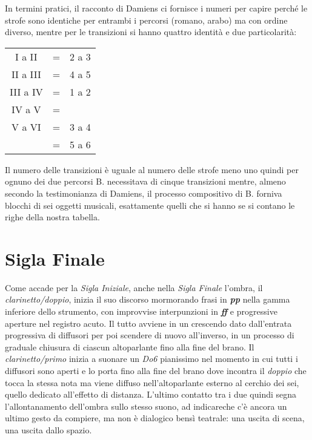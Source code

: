 In termini pratici, il racconto di Damiens ci fornisce i numeri per capire perché le strofe sono identiche per entrambi i percorsi (romano, arabo) ma con ordine diverso, mentre per le transizioni si hanno quattro identità e due particolarità:

\begin{minipage}[t]{0.89\columnwidth}%

\begin{table}[H]
\begin{tabular}{c c c}

I a II 		& = & 2 a 3 \\
II a III	& = & 4 a 5 \\
III a IV	& = & 1 a 2 \\
IV a V		& = &  \\
V a VI		& = & 3 a 4\\
			& = & 5 a 6 \\

\end{tabular}
\end{table}%

\end{minipage}%
\bigskip

Il numero delle transizioni è uguale al numero delle strofe meno uno quindi per ognuno dei due percorsi B. necessitava di cinque transizioni mentre, almeno secondo la testimonianza di Damiens, il processo compositivo di B. forniva blocchi di sei oggetti musicali, esattamente quelli che si hanno se si contano le righe della nostra tabella.

\section*{Sigla Finale}

Come accade per la \emph{Sigla Iniziale}, anche nella \emph{Sigla Finale} l'ombra, il \emph{clarinetto/doppio}, inizia il suo discorso mormorando frasi in \emph{\textbf{pp}} nella gamma inferiore dello strumento, con improvvise  interpunzioni in \emph{\textbf{ff}} e progressive aperture nel registro acuto. Il tutto avviene in un crescendo dato dall'entrata progressiva di diffusori per poi scendere di nuovo all'inverso, in un processo di graduale chiusura di ciascun altoparlante fino alla fine del brano. Il \emph{clarinetto/primo} inizia a suonare un \emph{Do6} pianissimo  nel momento in cui tutti i diffusori sono aperti e lo porta fino alla fine del brano dove incontra il \emph{doppio} che tocca la stessa nota ma viene diffuso nell'altoparlante esterno al cerchio dei sei, quello dedicato all'effetto di distanza. L'ultimo contatto tra i due quindi segna l'allontanamento dell'ombra sullo stesso suono, ad indicareche c'è ancora un ultimo gesto da compiere, ma non è dialogico bensì teatrale: una uscita di scena, una uscita dallo spazio.


